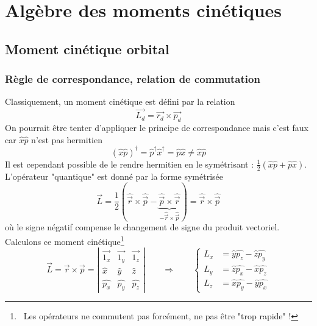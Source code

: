 \chapter{Algèbre des moments cinétiques}
\section{Moment cinétique orbital}
	\subsection{Règle de correspondance, relation de commutation}
	Classiquement, un moment cinétique est défini par la relation
	\begin{equation}
	\vec{L_d} = \vec{r_d}\times\vec{p_d}
	\end{equation}
	On pourrait être tenter d'appliquer le principe de correspondance mais c'est faux car 
	$\hat{x}\hat{p}$ n'est pas hermitien
	\begin{equation}
	(\hat{x}\hat{p})^\dagger = \hat{p}^\dagger\hat{x}^\dagger = \hat{p}\hat{x}\neq\hat{x}\hat{p}
	\end{equation}		
	Il est cependant possible de le rendre hermitien	en le symétrisant : $\frac{1}{2}(\hat{x}\hat{p}
	+\hat{p}\hat{x})$. L'opérateur "quantique" est donné par la forme symétrisée 
	\begin{equation}
	\vec{L} = \frac{1}{2}\left(\hat{\vec{r}}\times\hat{\vec{p}}-\underbrace{\hat{\vec{p}}\times
	\hat{\vec{r}}}_{-\hat{\vec{r}}\times\hat{\vec{p}}}\right) = \hat{\vec{r}}\times\hat{\vec{p}}
	\end{equation}
	où le signe négatif compense le changement de signe du produit vectoriel. Calculons ce moment 
	cinétique\footnote{\danger\ Les opérateurs ne commutent pas forcément, ne pas être "trop rapide" !}
	\begin{equation}
	\vec{L}=\vec{r}\times\vec{p} = \left|\begin{array}{ccc}
	\vec{1_x} & \vec{1_y} & \vec{1_z}\\
	\hat{x} & \hat{y} & \hat{z}\\
	\hat{p_x} & \hat{p_y} & \hat{p_z}
	\end{array}\right|\qquad\Longrightarrow\qquad\left\{\begin{array}{ll}
	L_x &= \hat{y}\hat{p_z} - \hat{z}\hat{p_y}\\
	L_y &= \hat{z}\hat{p_x}-\hat{x}\hat{p_z}\\
	L_z &= \hat{x}\hat{p_y}-\hat{y}\hat{p_x}
	\end{array}\right.
	\end{equation}
